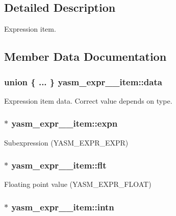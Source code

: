 \subsection{Detailed Description}
Expression item. 

\subsection{Member Data Documentation}
\hypertarget{structyasm__expr____item_a92f56293ae09d1ddd23c0f793759dedd}{
\subsubsection[{data}]{\setlength{\rightskip}{0pt plus 5cm}union \{ ... \}   yasm\-\_\-expr\-\_\-\-\_\-item\-::data}}\label{structyasm__expr____item_a92f56293ae09d1ddd23c0f793759dedd}
Expression item data. Correct value depends on type. \hypertarget{structyasm__expr____item_a774cdf884a1590ccc1af42c90e04155f}{
\subsubsection[{expn}]{$\ast$ yasm\-\_\-expr\-\_\-\-\_\-item\-::expn}}\label{structyasm__expr____item_a774cdf884a1590ccc1af42c90e04155f}
Subexpression (Y\-A\-S\-M\-\_\-\-E\-X\-P\-R\-\_\-\-E\-X\-P\-R) \hypertarget{structyasm__expr____item_a1be033f053639350332156389e0dda43}{
\subsubsection[{flt}]{$\ast$ yasm\-\_\-expr\-\_\-\-\_\-item\-::flt}}\label{structyasm__expr____item_a1be033f053639350332156389e0dda43}
Floating point value (Y\-A\-S\-M\-\_\-\-E\-X\-P\-R\-\_\-\-F\-L\-O\-A\-T) \hypertarget{structyasm__expr____item_a326176864071cb8e352077ca16e98b50}{
\subsubsection[{intn}]{$\ast$ yasm\-\_\-expr\-\_\-\-\_\-item\-::intn}}\label{structyasm__expr____item_a326176864071cb8e352077ca16e98b50}
